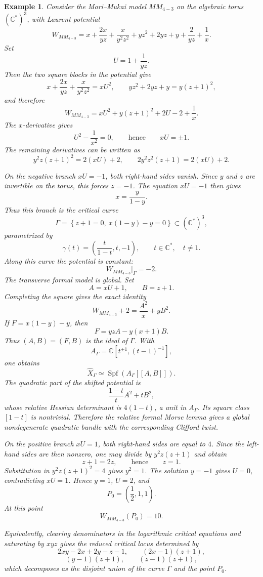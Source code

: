 \documentclass[11pt]{amsart}
\newtheorem{example}{Example}[section]
\begin{document}
\begin{example}
Consider the Mori--Mukai model $MM_{4-3}$ on the algebraic torus
$(\mathbb{C}^*)^3$, with Laurent potential
\[
W_{MM_{4-3}}=x+\frac{2x}{yz}+\frac{x}{y^2z^2}
+yz^2+2yz+y+\frac{2}{yz}+\frac{1}{x}.
\]
Set
\[
U=1+\frac{1}{yz}.
\]
Then the two square blocks in the potential give
\[
x+\frac{2x}{yz}+\frac{x}{y^2z^2}=xU^2,
\qquad
yz^2+2yz+y=y(z+1)^2,
\]
and therefore
\[
W_{MM_{4-3}}=xU^2+y(z+1)^2+2U-2+\frac{1}{x}.
\]
The $x$-derivative gives
\[
U^2-\frac{1}{x^2}=0,
\qquad\text{hence}\qquad
xU=\pm1.
\]
The remaining derivatives can be written as
\[
y^2z(z+1)^2=2(xU)+2,
\qquad
2y^2z^2(z+1)=2(xU)+2.
\]

On the negative branch $xU=-1$, both right-hand sides vanish. Since $y$ and
$z$ are invertible on the torus, this forces $z=-1$. The equation $xU=-1$
then gives
\[
x=\frac{y}{1-y}.
\]
Thus this branch is the critical curve
\[
\Gamma=\left\{z+1=0,\ x(1-y)-y=0\right\}
\subset (\mathbb{C}^*)^3,
\]
parametrized by
\[
\gamma(t)=\left(\frac{t}{1-t},t,-1\right),
\qquad
t\in\mathbb{C}^*,\quad t\neq1.
\]
Along this curve the potential is constant:
\[
W_{MM_{4-3}}|_{\Gamma}=-2.
\]
The transverse formal model is global. Set
\[
A=xU+1,
\qquad
B=z+1.
\]
Completing the square gives the exact identity
\[
W_{MM_{4-3}}+2=\frac{A^2}{x}+yB^2.
\]
If $F=x(1-y)-y$, then
\[
F=yzA-y(x+1)B.
\]
Thus $(A,B)=(F,B)$ is the ideal of $\Gamma$. With
\[
A_{\Gamma}=\mathbb C[t^{\pm1},(t-1)^{-1}],
\]
one obtains
\[
\widehat X_{\Gamma}
\simeq
\operatorname{Spf}\!\left(A_{\Gamma}[[A,B]]\right).
\]
The quadratic part of the shifted potential is
\[
\frac{1-t}{t}A^2+tB^2,
\]
whose relative Hessian determinant is $4(1-t)$, a unit in $A_{\Gamma}$.
Its square class $[1-t]$ is nontrivial. Therefore the relative formal Morse
lemma gives a global nondegenerate quadratic bundle with the corresponding
Clifford twist.

On the positive branch $xU=1$, both right-hand sides are equal to $4$. Since
the left-hand sides are then nonzero, one may divide by $y^2z(z+1)$ and obtain
\[
z+1=2z,
\qquad\text{hence}\qquad
z=1.
\]
Substitution in $y^2z(z+1)^2=4$ gives $y^2=1$. The solution $y=-1$ gives
$U=0$, contradicting $xU=1$. Hence $y=1$, $U=2$, and
\[
P_0=\left(\frac{1}{2},1,1\right).
\]
At this point
\[
W_{MM_{4-3}}(P_0)=10.
\]

Equivalently, clearing denominators in the logarithmic critical equations and
saturating by $xyz$ gives the reduced critical locus determined by
\[
2xy-2x+2y-z-1,
\qquad
(2x-1)(z+1),
\]
\[
(y-1)(z+1),
\qquad
(z-1)(z+1),
\]
which decomposes as the disjoint union of the curve $\Gamma$ and the point
$P_0$.


\end{example}
\end{document}
